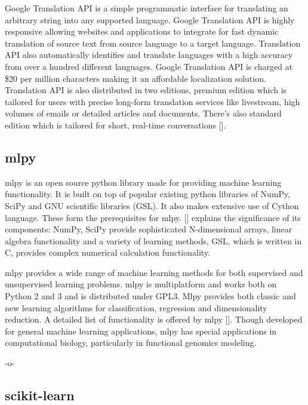 Google Translation API is a simple programmatic interface for
translating an arbitrary string into any supported language. Google
Translation API is highly responsive allowing websites and
applications to integrate for fast dynamic translation of source text
from source language to a target language. Translation API also
automatically identifies and translate languages with a high accuracy
from over a hundred different languages.  Google Translation API is
charged at \$20 per million characters making it an affordable
localization solution. Translation API is also distributed in two
editions, premium edition which is tailored for users with precise
long-form translation services like livestream, high volumes of emails
or detailed articles and documents. There's also standard edition
which is tailored for short, real-time conversations
[\cite{www-translation}].

\subsection{mlpy }
    
mlpy is an open source python library made for providing machine
learning functionality. It is built on top of popular existing python
libraries of NumPy, SciPy and GNU scientific libraries (GSL). It also
makes extensive use of Cython language. These form the prerequisites
for mlpy. [\cite{DBLP:journals/corr/abs-1202-6548}] explains the
significance of its components: NumPy, SciPy provide sophisticated
N-dimensional arrays, linear algebra functionality and a variety of
learning methods, GSL, which is written in C, provides complex
numerical calculation functionality.

mlpy provides a wide range of machine learning methods for both
supervised and unsupervised learning problems. mlpy is multiplatform
and works both on Python 2 and 3 and is distributed under GPL3. Mlpy
provides both classic and new learning algorithms for classification,
regression and dimensionality reduction. A detailed list of
functionality is offered by mlpy [\cite{www-mlpy}]. Though developed for
general machine learning applications, mlpy has special applications
in computational biology, particularly in functional genomics
modeling.

    -o-

\subsection{scikit-learn}

